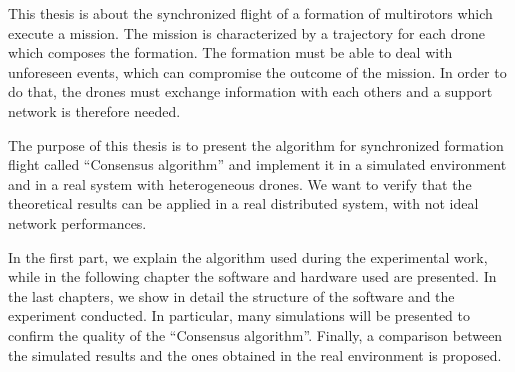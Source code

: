 



This thesis is about the synchronized flight of a formation of multirotors which execute a mission.
The mission is characterized by a trajectory for each drone which composes the formation.
The formation must be able to deal with unforeseen events, which can compromise
the outcome of the mission. In order to do that, the drones must exchange information
with each others and a support network is therefore needed.

The purpose of this thesis is to present the algorithm for synchronized formation flight
called “Consensus algorithm” and implement it in a simulated environment
and in a real system with heterogeneous drones. We want to verify that the theoretical
results can be applied in a real distributed system, with not ideal network performances.

In the first part, we explain the algorithm used during the experimental work,
while in the following chapter the software and hardware used are presented.
In the last chapters, we show in detail the structure of the software and the experiment conducted.
In particular, many simulations will be presented to confirm the quality of the
“Consensus algorithm”. Finally, a comparison between the simulated results and the ones
obtained in the real environment is proposed.
